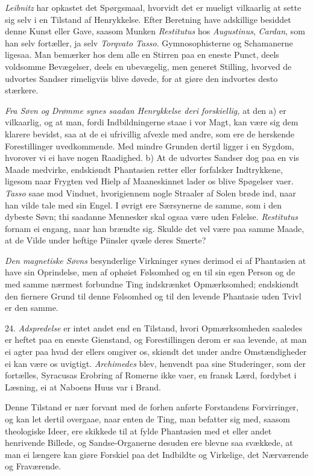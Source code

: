 \documentclass[12pt,a4paper]{article}
\newcommand{\opage}[1]{\marginnote{\footnotesize\textit{[#1]}}}
\begin{document}
\emph{Leibnitz} har opkastet det Spørgsmaal, hvorvidt det er mueligt vilkaarlig at sette
sig selv i en Tilstand af Henrykkelse. Efter Beretning have adskillige besiddet denne
Kunst eller Gave, saasom Munken \emph{Restitutus} hos \emph{Augustinus}, \emph{Cardan},
som han selv fortæller, ja selv \emph{Torqvato Tasso}. Gymnosophisterne og Schamanerne
ligesaa. Man bemærker hos dem alle en Stirren paa en eneste Punct, deels voldsomme
Bevægelser, deels en ubevægelig, men generet Stilling, hvorved de udvortes Sandser
rimeligviis blive døvede, for at giøre den indvortes desto stærkere.

\opage{145} \emph{Fra Søvn og Drømme synes saadan Henrykkelse deri forskiellig,} at den a) er
vilkaarlig, og at man, fordi Indbildningerne staae i vor Magt, kan være sig dem klarere
bevidst, saa at de ei ufrivillig afvexle med andre, som ere de herskende Forestillinger
uvedkommende. Med mindre Grunden dertil ligger i en Sygdom, hvorover vi ei have nogen
Raadighed. b) At de udvortes Sandser dog paa en vis Maade medvirke, endskiøndt Phantasien
retter eller forfalsker Indtrykkene, ligesom naar Frygten ved Hielp af Maaneskinnet lader
os blive Spøgelser vaer. \emph{Tasso} saae mod Vinduet, hvorigiennem nogle Straaler af
Solen brøde ind, naar han vilde tale med sin Engel. I øvrigt ere Særsynerne de samme, som
i den dybeste Søvn; thi saadanne Mennesker skal ogsaa være uden Følelse.
\emph{Restitutus} fornam ei engang, naar han brændte sig. Skulde det vel være paa samme
Maade, at de Vilde under heftige Piinsler qvæle deres Smerte?

\emph{Den magnetiske Søvns} besynderlige Virkninger synes derimod ei af Phantasien at
have sin Oprindelse, men af ophøiet Følsomhed og en til sin egen Person og de med samme
nærmest forbundne Ting indskrænket Opmærksomhed; endskiøndt den fiernere Grund til denne
Følsomhed og til den levende Phantasie uden Tvivl er den samme.

\opage{146} 24. \emph{Adspredelse} er intet andet end en Tilstand, hvori Opmærksomheden saaledes er
heftet paa en eneste Gienstand, og Forestillingen derom er saa levende, at man ei agter
paa hvad der ellers omgiver os, skiøndt det under andre Omstændigheder ei kan være os
uvigtigt. \emph{Archimedes} blev, henvendt paa sine Studeringer, som der fortælles,
Syracusas Erobring af Romerne ikke vaer, en fransk Lærd, fordybet i Læsning, ei at
Naboens Huus var i Brand.

Denne Tilstand er nær forvant med de forhen anførte Forstandens Forvirringer, og kan let
dertil overgaae, naar enten de Ting, man befatter sig med, saasom theologiske Ideer, ere
skikkede til at fylde Phantasien med et eller andet henrivende Billede, og
Sandse-Organerne desuden ere blevne saa svækkede, at man ei længere kan giøre Forskiel
paa det Indbildte og Virkelige, det Nærværende og Fraværende.
\end{document}
